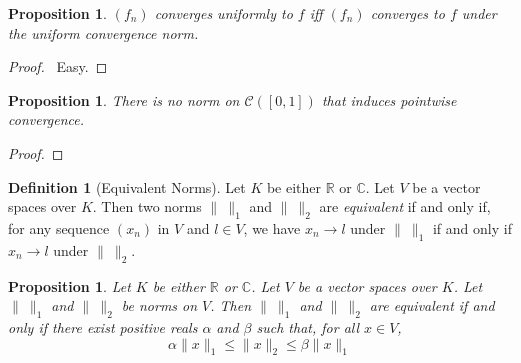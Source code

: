 \documentclass{book}
\let\qed\relax
\newtheorem{prop}[ax]{Proposition}
\theoremstyle{definition}
\newtheorem{df}[ax]{Definition}
\begin{document}
\begin{prop}
$(f_n)$ converges uniformly to $f$ iff $(f_n)$ converges to $f$ under the uniform convergence norm.
\end{prop}

\begin{proof}
\pf\ Easy. \qed
\end{proof}

\begin{prop}
There is no norm on $\mathcal{C}([0,1])$ that induces pointwise convergence.
\end{prop}

\begin{proof}
\pf
{}
\qed
\end{proof}

\begin{df}[Equivalent Norms]
Let $K$ be either $\mathbb{R}$ or $\mathbb{C}$. Let $V$ be a vector spaces over $K$. Then two norms $\|\ \|_1$ and $\|\ \|_2$ are \emph{equivalent} if and only if, for any sequence $(x_n)$ in $V$ and $l \in V$, we have $x_n \rightarrow l$ under $\|\ \|_1$ if and only if $x_n \rightarrow l$ under $\|\ \|_2$.
\end{df}

\begin{prop}
Let $K$ be either $\mathbb{R}$ or $\mathbb{C}$. Let $V$ be a vector spaces over $K$. Let $\|\ \|_1$ and $\|\ \|_2$ be norms on $V$. Then $\|\ \|_1$ and $\|\ \|_2$ are equivalent if and only if there exist positive reals $\alpha$ and $\beta$ such that, for all $x \in V$,
\begin{equation}
\label{eq:eqnorm}
 \alpha \| x \|_1 \leq \| x \|_2 \leq \beta \| x \|_1
 \end{equation}
\end{prop}
\end{document}
